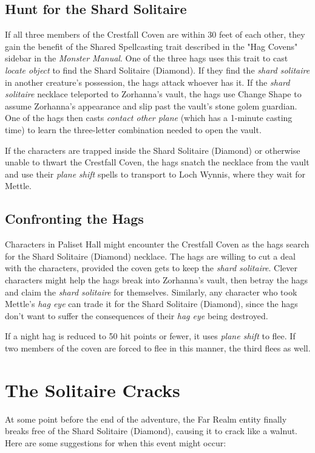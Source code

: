 \documentclass[10pt,a4paper,twoside,bg=print,twocolumn,openany,nodeprecatedcode]{dndbook}
\begin{document}
\subsection{Hunt for the Shard Solitaire}
If all three members of the Crestfall Coven are within 30 feet of each other, they gain the benefit of the Shared Spellcasting trait described in the "Hag Covens" sidebar in the \textit{Monster Manual}. One of the three hags uses this trait to cast \textit{locate object} to find the Shard Solitaire (Diamond). If they find the \textit{shard solitaire} in another creature's possession, the hags attack whoever has it. If the \textit{shard solitaire} necklace teleported to Zorhanna's vault, the hags use Change Shape to assume Zorhanna's appearance and slip past the vault's stone golem guardian. One of the hags then casts \textit{contact other plane} (which has a 1-minute casting time) to learn the three-letter combination needed to open the vault.

If the characters are trapped inside the Shard Solitaire (Diamond) or otherwise unable to thwart the Crestfall Coven, the hags snatch the necklace from the vault and use their \textit{plane shift} spells to transport to Loch Wynnis, where they wait for Mettle.

\subsection{Confronting the Hags}
Characters in Paliset Hall might encounter the Crestfall Coven as the hags search for the Shard Solitaire (Diamond) necklace. The hags are willing to cut a deal with the characters, provided the coven gets to keep the \textit{shard solitaire}. Clever characters might help the hags break into Zorhanna's vault, then betray the hags and claim the \textit{shard solitaire} for themselves. Similarly, any character who took Mettle's \textit{hag eye} can trade it for the Shard Solitaire (Diamond), since the hags don't want to suffer the consequences of their \textit{hag eye} being destroyed.

If a night hag is reduced to 50 hit points or fewer, it uses \textit{plane shift} to flee. If two members of the coven are forced to flee in this manner, the third flees as well.

\section{The Solitaire Cracks}
At some point before the end of the adventure, the Far Realm entity finally breaks free of the Shard Solitaire (Diamond), causing it to crack like a walnut. Here are some suggestions for when this event might occur:
\end{document}
